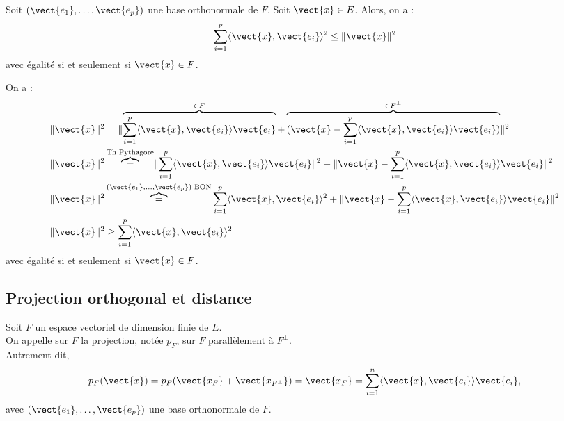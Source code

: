 \documentclass{book}
\begin{document}
\begin{Corollaire}
Soit $(\vect{e_1},\dots,\vect{e_p})$ une base orthonormale de $F$. Soit $\vect{x}\in E$.
Alors, on a :
$$\sum_{i=1}^p \PS{\vect{x}}{\vect{e_i}}^2\leq \norme{\vect{x}}^2$$
avec égalité si et seulement si $\vect{x} \in F$.
\end{Corollaire}
\begin{Demonstration}
On a :
$$\begin{aligned}
\norme{\vect{x}}^2 &=  \norme{\overbrace{\sum_{i=1}^p \PS{\vect{x}}{\vect{e_i}} \vect{e_i}}^{\in F} +\overbrace{(\vect{x}-\sum_{i=1}^p \PS{\vect{x}}{\vect{e_i}} \vect{e_i})}^{\in F^{\perp} }}^2\\
\norme{\vect{x}}^2 &\overbrace{=}^{\text{Th Pythagore}}\norme{\sum_{i=1}^p \PS{\vect{x}}{\vect{e_i}} \vect{e_i}}^2 +\norme{\vect{x}-\sum_{i=1}^p \PS{\vect{x}}{\vect{e_i}} \vect{e_i}}^2\\
\norme{\vect{x}}^2 &\overbrace{=}^{(\vect{e_1},\dots,\vect{e_p}) \text{ BON} }\sum_{i=1}^p \PS{\vect{x}}{\vect{e_i}}^2+\norme{\vect{x}-\sum_{i=1}^p \PS{\vect{x}}{\vect{e_i}} \vect{e_i}}^2\\
\norme{\vect{x}}^2 &\geq \sum_{i=1}^p \PS{\vect{x}}{\vect{e_i}}^2
\end{aligned}$$
avec égalité si et seulement si $\vect{x} \in F$.
\end{Demonstration}



\subsection{Projection orthogonal et distance}
\begin{Definition}
Soit $F$ un espace vectoriel de dimension finie de $E$.\\
On appelle  sur $F$ la projection, notée $p_F$, sur $F$ parallèlement à $F^{\perp}$.\\
Autrement dit, $$p_F(\vect{x})=p_F(\vect{x_F}+\vect{x_{F^{\perp}}})=\vect{x_F}=\sum_{i=1}^{n}\PS{\vect{x}}{\vect{e_i}} \vect{e_i},$$
avec $(\vect{e_1},\dots,\vect{e_p})$ une base orthonormale de $F$. 
\begin{center}
\end{center}
\end{Definition}
\end{document}
